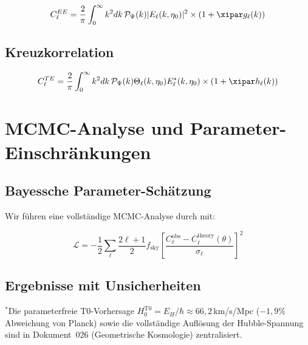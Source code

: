 	\begin{equation}
		C_\ell^{EE} = \frac{2}{\pi}\int_0^\infty k^2 dk \, \mathcal{P}_\Psi(k) |E_\ell(k,\eta_0)|^2 \times \left(1 + \xipar g_\ell(k)\right)
	\end{equation}
	
	\subsection{Kreuzkorrelation}
	
	\begin{equation}
		C_\ell^{TE} = \frac{2}{\pi}\int_0^\infty k^2 dk \, \mathcal{P}_\Psi(k) \Theta_\ell(k,\eta_0) E_\ell^*(k,\eta_0) \times \left(1 + \xipar h_\ell(k)\right)
	\end{equation}
	
	\section{MCMC-Analyse und Parameter-Einschränkungen}
	\label{sec:mcmc}
	
	\subsection{Bayessche Parameter-Schätzung}
	
	Wir führen eine vollständige MCMC-Analyse durch mit:
	
	\begin{equation}
		\mathcal{L} = -\frac{1}{2}\sum_{\ell} \frac{2\ell+1}{2} f_{\text{sky}} \left[\frac{C_\ell^{\text{obs}} - C_\ell^{\text{theory}}(\theta)}{\sigma_\ell}\right]^2
	\end{equation}
	
	\subsection{Ergebnisse mit Unsicherheiten}
	
	\begin{table}[htbp]
		\centering
		\caption{T0-Parameter-Einschränkungen (68\% CL)}
		\label{tab:parameters}
	\end{table}
{$^*$Die parameterfreie T0-Vorhersage $H_0^{\text{T0}} = E_H/\hbar \approx 66{,}2\,$km/s/Mpc ($-1{,}9\%$ Abweichung von Planck) sowie die vollständige Auflösung der Hubble-Spannung sind in Dokument~026 (Geometrische Kosmologie) zentralisiert.}
	
